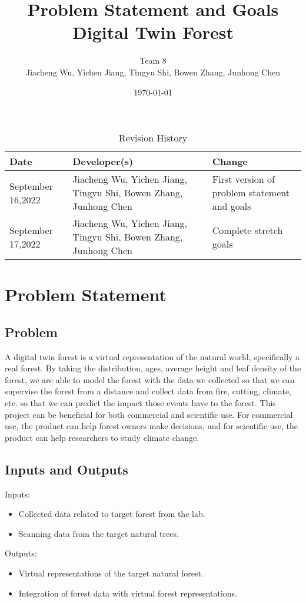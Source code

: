 \documentclass{article}
\title{Problem Statement and Goals\\ Digital Twin Forest}
\author{Team 8\\Jiacheng Wu, Yichen Jiang, Tingyu Shi, Bowen Zhang, Junhong Chen}
\date{\today}
\begin{document}
\maketitle

\begin{table}[hp]
\centering
\caption{Revision History} \label{TblRevisionHistory}
\begin{tabularx}{11cm}{X X X}
\toprule
\textbf{Date} & \textbf{Developer(s)} & \textbf{Change}\\
\midrule
September 16,2022 & Jiacheng Wu, Yichen Jiang, Tingyu Shi, Bowen Zhang, Junhong Chen & First version of problem statement and goals\\
\hline
September 17,2022 & Jiacheng Wu, Yichen Jiang, Tingyu Shi, Bowen Zhang, Junhong Chen & Complete stretch goals\\
\bottomrule
\end{tabularx}
\end{table}

\section{Problem Statement}
\subsection{Problem}
A digital twin forest is a virtual representation of the natural world, specifically a real forest. By taking the distribution, ages, average height and leaf density of the forest, we are able to model the forest with the data we collected so that we can supervise the forest from a distance and collect data from fire, cutting, climate, etc. so that we can predict the impact those events have to the forest. This project can be beneficial for both commercial and scientific use. For commercial use, the product can help forest owners make decisions, and for scientific use, the product can help researchers to study climate change.

\subsection{Inputs and Outputs}

Inputs:
\begin{itemize}
    \item Collected data related to target forest from the lab. 
    \item Scanning data from the target natural trees.
\end{itemize}
Outputs:
\begin{itemize}
    \item Virtual representations of the target natural forest.
    \item Integration of forest data with virtual forest representations.
\end{itemize}
\end{document}
